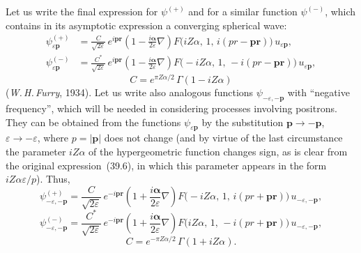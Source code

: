 Let us write the final expression for $\psi^{(+)}$ and for a similar function $\psi^{(-)}$, which contains in its asymptotic expression a converging spherical wave:
\begin{equation}
\begin{aligned}
\psi^{(+)}_{\varepsilon\mathbf{p}} &= \frac{C}{\sqrt{2\varepsilon}}\,e^{i\mathbf{p}\mathbf{r}}\!\left(1 - \frac{i\boldsymbol{\alpha}}{2\varepsilon}\nabla\right)\!F\bigl(iZ\alpha,\,1,\,i(pr - \mathbf{p}\mathbf{r})\bigr)\,u_{\varepsilon\mathbf{p}},\\[6pt]
\psi^{(-)}_{\varepsilon\mathbf{p}} &= \frac{C^*}{\sqrt{2\varepsilon}}\,e^{i\mathbf{p}\mathbf{r}}\!\left(1 - \frac{i\boldsymbol{\alpha}}{2\varepsilon}\nabla\right)\!F\bigl(-iZ\alpha,\,1,\,-i(pr - \mathbf{p}\mathbf{r})\bigr)\,u_{\varepsilon\mathbf{p}},
\end{aligned}
\tag{39.10}
\end{equation}
\[
C = e^{\pi Z\alpha/2}\,\Gamma(1 - iZ\alpha)
\]
(\textit{W.\,H.\,Furry}, 1934). Let us write also analogous functions $\psi_{-\varepsilon,-\mathbf{p}}$ with ``negative frequency'', which will be needed in considering processes involving positrons. They can be obtained from the functions $\psi_{\varepsilon\mathbf{p}}$ by the substitution $\mathbf{p}\to-\mathbf{p}$, $\varepsilon\to-\varepsilon$, where $p = |\mathbf{p}|$ does not change (and by virtue of the last circumstance the parameter $iZ\alpha$ of the hypergeometric function changes sign, as is clear from the original expression~(39.6), in which this parameter appears in the form $iZ\alpha\varepsilon/p$). Thus,
\[
\psi^{(+)}_{-\varepsilon,-\mathbf{p}} = \frac{C}{\sqrt{2\varepsilon}}\,e^{-i\mathbf{p}\mathbf{r}}\!\left(1 + \frac{i\boldsymbol{\alpha}}{2\varepsilon}\nabla\right)\!F\bigl(-iZ\alpha,\,1,\,i(pr + \mathbf{p}\mathbf{r})\bigr)\,u_{-\varepsilon,-\mathbf{p}},
\]
\begin{equation}
\psi^{(-)}_{-\varepsilon,-\mathbf{p}} = \frac{C^*}{\sqrt{2\varepsilon}}\,e^{-i\mathbf{p}\mathbf{r}}\!\left(1 + \frac{i\boldsymbol{\alpha}}{2\varepsilon}\nabla\right)\!F\bigl(iZ\alpha,\,1,\,-i(pr + \mathbf{p}\mathbf{r})\bigr)\,u_{-\varepsilon,-\mathbf{p}},
\tag{39.11}
\end{equation}
\[
C = e^{-\pi Z\alpha/2}\,\Gamma(1 + iZ\alpha).
\]

